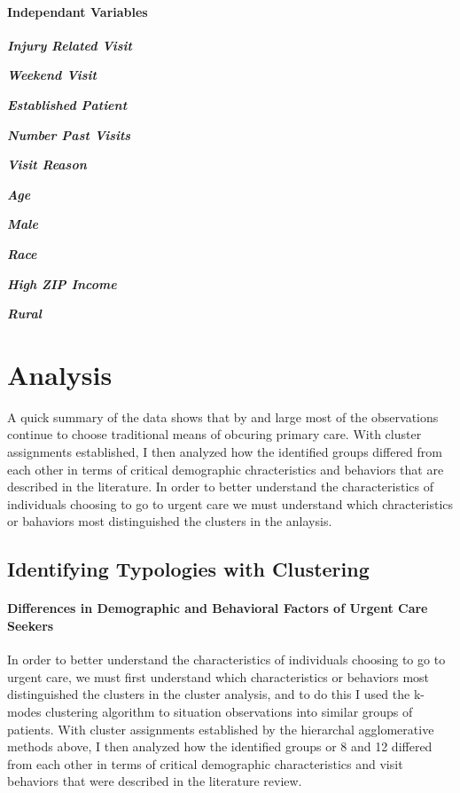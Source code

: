 \documentclass[12pt,twoside]{reedthesis}
\begin{document}
  \subsubsection{Independant Variables}\label{independant-variables}
  
  \textbf{\emph{Injury Related Visit}}
  
  \textbf{\emph{Weekend Visit}}
  
  \textbf{\emph{Established Patient}}
  
  \textbf{\emph{Number Past Visits}}
  
  \textbf{\emph{Visit Reason}}
  
  \textbf{\emph{Age}}
  
  \textbf{\emph{Male}}
  
  \textbf{\emph{Race}}
  
  \textbf{\emph{High ZIP Income}}
  
  \textbf{\emph{Rural}}
  
  \chapter{Analysis}\label{analysis}
  
  \doublespacing
  
  A quick summary of the data shows that by and large most of the
  observations continue to choose traditional means of obcuring primary
  care. With cluster assignments established, I then analyzed how the
  identified groups differed from each other in terms of critical
  demographic chracteristics and behaviors that are described in the
  literature. In order to better understand the characteristics of
  individuals choosing to go to urgent care we must understand which
  chracteristics or bahaviors most distinguished the clusters in the
  anlaysis.
  
  \section{Identifying Typologies with
  Clustering}\label{identifying-typologies-with-clustering}
  
  \subsubsection{Differences in Demographic and Behavioral Factors of
  Urgent Care
  Seekers}\label{differences-in-demographic-and-behavioral-factors-of-urgent-care-seekers}
  
  In order to better understand the characteristics of individuals
  choosing to go to urgent care, we must first understand which
  characteristics or behaviors most distinguished the clusters in the
  cluster analysis, and to do this I used the k-modes clustering algorithm
  to situation observations into similar groups of patients. With cluster
  assignments established by the hierarchal agglomerative methods above, I
  then analyzed how the identified groups or 8 and 12 differed from each
  other in terms of critical demographic characteristics and visit
  behaviors that were described in the literature review.
  
\end{document}

